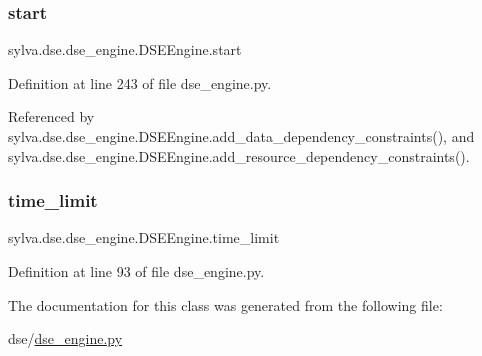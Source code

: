 \mbox{\label{classsylva_1_1dse_1_1dse__engine_1_1_d_s_e_engine_abb10a808dffa700d7b08b5db00642012}} 
\subsubsection{\texorpdfstring{start}{start}}
{\footnotesize\ttfamily sylva.\+dse.\+dse\+\_\+engine.\+D\+S\+E\+Engine.\+start}



Definition at line 243 of file dse\+\_\+engine.\+py.



Referenced by sylva.\+dse.\+dse\+\_\+engine.\+D\+S\+E\+Engine.\+add\+\_\+data\+\_\+dependency\+\_\+constraints(), and sylva.\+dse.\+dse\+\_\+engine.\+D\+S\+E\+Engine.\+add\+\_\+resource\+\_\+dependency\+\_\+constraints().

\mbox{\label{classsylva_1_1dse_1_1dse__engine_1_1_d_s_e_engine_a1520ce483781f1abea8275fb75bbc742}} 
\subsubsection{\texorpdfstring{time\+\_\+limit}{time\_limit}}
{\footnotesize\ttfamily sylva.\+dse.\+dse\+\_\+engine.\+D\+S\+E\+Engine.\+time\+\_\+limit}



Definition at line 93 of file dse\+\_\+engine.\+py.



The documentation for this class was generated from the following file\+:\begin{DoxyCompactItemize}
\item 
dse/\hyperlink{dse__engine_8py}{dse\+\_\+engine.\+py}\end{DoxyCompactItemize}
